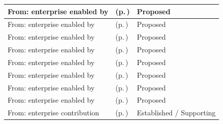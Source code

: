 \begin{longtable}{|>{\raggedright\arraybackslash}p{0.27\TableWidth}|>{\raggedright\arraybackslash}p{0.48\TableWidth}|>{\raggedright\arraybackslash}p{0.25\TableWidth}|}
From: enterprise enabled by & \nameref{cap:bec-emergency-care} (p.\,\pageref{cap:bec-emergency-care}) & Proposed\\\hline
From: enterprise enabled by & \nameref{cap:bec-inpatient-care} (p.\,\pageref{cap:bec-inpatient-care}) & Proposed\\\hline
From: enterprise enabled by & \nameref{cap:bec-community-care} (p.\,\pageref{cap:bec-community-care}) & Proposed\\\hline
From: enterprise enabled by & \nameref{cap:bec-outreach-care} (p.\,\pageref{cap:bec-outreach-care}) & Proposed\\\hline
From: enterprise enabled by & \nameref{cap:bec-remote-virtual-care} (p.\,\pageref{cap:bec-remote-virtual-care}) & Proposed\\\hline
From: enterprise enabled by & \nameref{cap:bec-preventive-care} (p.\,\pageref{cap:bec-preventive-care}) & Proposed\\\hline
From: enterprise enabled by & \nameref{cap:bec-diagnostic-services} (p.\,\pageref{cap:bec-diagnostic-services}) & Proposed\\\hline
From: enterprise enabled by & \nameref{cap:bec-medication-therapy} (p.\,\pageref{cap:bec-medication-therapy}) & Proposed\\\hline
From: enterprise contribution & \nameref{cap:bec-assurance-criteria-management} (p.\,\pageref{cap:bec-assurance-criteria-management}) & Established / Supporting\\\hline
\end{longtable}\endgroup

